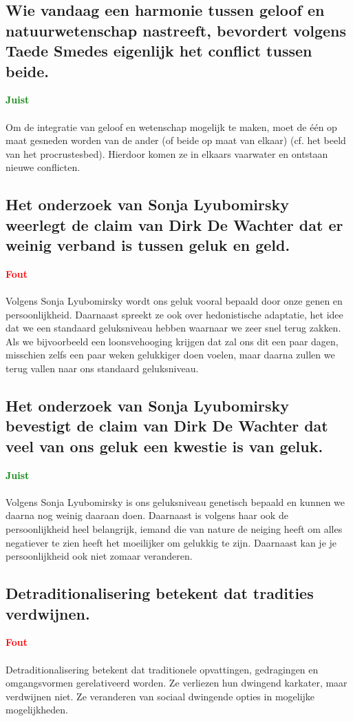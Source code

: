 \documentclass[11pt,a4paper,titlepage]{article}
\begin{document}
\subsection{Wie vandaag een harmonie tussen geloof en natuurwetenschap nastreeft, bevordert volgens
Taede Smedes eigenlijk het conflict tussen beide.}
\textcolor{green}{\textbf{Juist}}\\\\
Om de integratie van geloof en wetenschap mogelijk te maken, moet de één op maat gesneden worden van de ander (of beide op maat van elkaar) (cf. het beeld van het procrustesbed). Hierdoor komen ze in elkaars vaarwater en ontstaan nieuwe conflicten.

\subsection{Het onderzoek van Sonja Lyubomirsky weerlegt de claim van Dirk De Wachter dat er weinig verband is tussen geluk en geld.}
\textcolor{red}{\textbf{Fout}}\\\\
Volgens Sonja Lyubomirsky wordt ons geluk vooral bepaald door onze genen en persoonlijkheid. Daarnaast spreekt ze ook over hedonistische adaptatie, het idee dat we een standaard geluksniveau hebben waarnaar we zeer snel terug zakken. Als we bijvoorbeeld een loonsvehooging krijgen dat zal ons dit een paar dagen, misschien zelfs een paar weken gelukkiger doen voelen, maar daarna zullen we terug vallen naar ons standaard geluksniveau.

\subsection{Het onderzoek van Sonja Lyubomirsky bevestigt de claim van Dirk De Wachter dat veel van ons geluk een kwestie is van geluk.}
\textcolor{green}{\textbf{Juist}}\\\\
Volgens Sonja Lyubomirsky is ons geluksniveau genetisch bepaald en kunnen we daarna nog weinig daaraan doen. Daarnaast is volgens haar ook de persoonlijkheid heel belangrijk, iemand die van nature de neiging heeft om alles negatiever te zien heeft het moeilijker om gelukkig te zijn. Daarnaast kan je je persoonlijkheid ook niet zomaar veranderen.

\subsection{Detraditionalisering betekent dat tradities verdwijnen.}
\textcolor{red}{\textbf{Fout}}\\\\
Detraditionalisering betekent dat traditionele opvattingen, gedragingen en omgangsvormen gerelativeerd worden. Ze verliezen hun dwingend karkater, maar verdwijnen niet. Ze veranderen van sociaal dwingende opties in mogelijke mogelijkheden.
\end{document}
